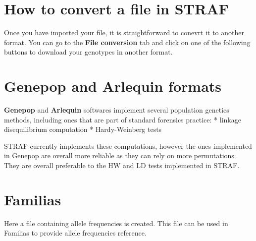 \documentclass[
]{book}
\begin{document}
\hypertarget{how-to-convert-a-file-in-straf}{%
\section{How to convert a file in STRAF}\label{how-to-convert-a-file-in-straf}}

Once you have imported your file, it is straightforward to conevrt it to another
format. You can go to the \textbf{File conversion} tab and click on one of the following
buttons to download your genotypes in another format.

\hypertarget{genepop-and-arlequin-formats}{%
\section{Genepop and Arlequin formats}\label{genepop-and-arlequin-formats}}

\textbf{Genepop} and \textbf{Arlequin} softwares implement several population genetics methods,
including ones that are part of standard forensics practice:
* linkage disequilibrium computation
* Hardy-Weinberg tests

STRAF currently implements these computations, however the ones implemented in
Genepop are overall more reliable as they can rely on more permutations. They
are overall preferable to the HW and LD tests implemented in STRAF.

\hypertarget{familias}{%
\section{Familias}\label{familias}}

Here a file containing allele frequencies is created. This file can be used in
Familias to provide allele frequencies reference.
\end{document}
